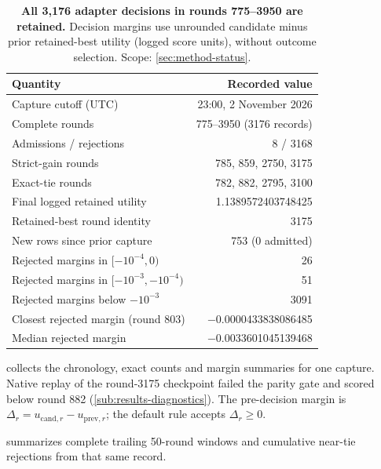 \begin{table}[!htbp]
  \caption{\textbf{All 3,176 adapter decisions in rounds 775--3950 are retained.}
  Decision margins use unrounded candidate minus prior retained-best
  utility (logged score units), without outcome selection. Scope: \cref{sec:method-status}.}
  \label{tab:admission-ledger}
  \centering\footnotesize\setlength{\tabcolsep}{4pt}\renewcommand{\arraystretch}{0.92}%
  \begin{tabularx}{\linewidth}{@{}>{\raggedright\arraybackslash}Xr@{}}
    \toprule
    Quantity & Recorded value \\
    \midrule
    Capture cutoff (UTC) & 23:00, 2 November 2026 \\
    Complete rounds & 775--3950 (\num{3176} records) \\
    Admissions / rejections & 8 / \num{3168} \\
    Strict-gain rounds & 785, 859, 2750, 3175 \\
    Exact-tie rounds & 782, 882, 2795, 3100 \\
    Final logged retained utility & \num{1.1389572403748425} \\
    Retained-best round identity & 3175 \\
    New rows since prior capture & 753 (0 admitted) \\
    Rejected margins in $[-10^{-4},0)$ & 26 \\
    Rejected margins in $[-10^{-3},-10^{-4})$ & 51 \\
    Rejected margins below $-10^{-3}$ & \num{3091} \\
    Closest rejected margin (round 803) & \num{-0.0000433838086485} \\
    Median rejected margin & \num{-0.0033601045139468} \\
    \bottomrule
  \end{tabularx}
\end{table}

 collects the chronology, exact counts and
margin summaries for one capture. Native replay of the round-3175 checkpoint failed
the parity gate and scored below round 882 (\cref{sub:results-diagnostics}).
The pre-decision margin is
$\Delta_r=u_{\mathrm{cand},r}-u_{\mathrm{prev},r}$;
the default rule accepts $\Delta_r\geq0$.

 summarizes complete trailing 50-round
windows and cumulative near-tie rejections from that same record.
